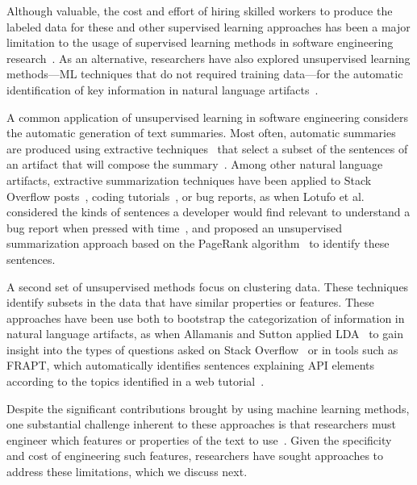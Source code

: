 Although valuable, the cost and effort of hiring skilled workers to produce 
the labeled data for these and other supervised learning approaches
has been a major limitation 
to the usage of supervised learning 
methods in software engineering research~\cite{Arpteg2018, ferreira2021}. As an alternative,
researchers have also explored 
 unsupervised learning methods---\acs{ML} techniques that do not required training data---for the automatic 
identification of 
key information in natural language artifacts~\cite{}.





A common application of unsupervised learning in software engineering
considers the automatic generation of text summaries.
Most often, automatic summaries are produced 
using extractive techniques~\cite{a} that select a subset of 
the sentences of an artifact that will compose the summary~\cite{a}.
Among other natural language artifacts,
extractive summarization techniques
have been applied to Stack Overflow posts~\cite{a}, coding tutorials~\cite{a},
or bug reports, as
when Lotufo et al. 
considered the kinds of sentences a developer would find relevant 
to understand a bug report when pressed with time~\cite{Lotufo2012},
and proposed an unsupervised summarization approach 
based on the PageRank algorithm~\cite{Page1999}
to identify these sentences. 




A second set of unsupervised methods focus on clustering data.
These techniques identify 
subsets in the data that have similar properties or features. 
These approaches have been use both to 
bootstrap the categorization of information in 
natural language artifacts, 
as when Allamanis and Sutton
applied \acf{LDA}~\cite{blei2003latent}
to gain insight into the types of questions 
asked on Stack Overflow~\cite{Allamanis2013}
or in tools such as FRAPT,
which 
automatically identifies sentences explaining API elements 
according to the topics
identified in a web tutorial~\cite{Jiang2017}.



Despite the significant 
contributions brought by using machine learning methods, one substantial challenge inherent to these
approaches is that researchers must engineer which 
features or properties of the text to use~\cite{ferreira2021}.
Given the specificity and cost of engineering such features, 
researchers have sought approaches to address these 
limitations, which we discuss next. 





